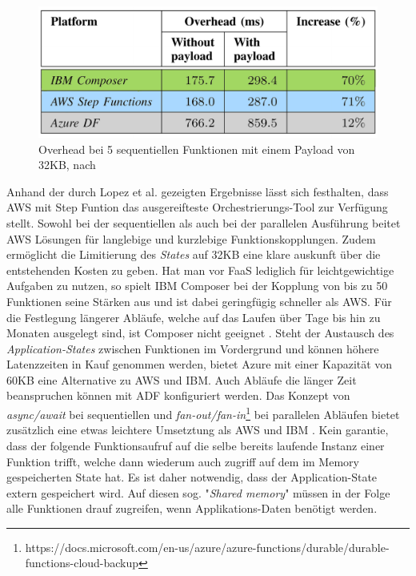 \documentclass[11pt]{article}
\begin{document}
\begin{figure}[H]
\caption{Overhead bei 5 sequentiellen Funktionen mit einem Payload von 32KB, nach \cite{lopez2018comparison}}
\label{fig:orchestration}
\centering
\includegraphics[width=1\textwidth]{Orchestration}
\end{figure} 
Anhand der durch Lopez et al. gezeigten Ergebnisse lässt sich festhalten, dass AWS mit Step Funtion das ausgereifteste Orchestrierungs-Tool zur Verfügung stellt. Sowohl bei der sequentiellen als auch bei der parallelen Ausführung beitet AWS Lösungen für langlebige und kurzlebige Funktionskopplungen. Zudem ermöglicht die Limitierung des \textit{States} auf 32KB eine klare auskunft über die entstehenden Kosten zu geben. Hat man vor FaaS lediglich für leichtgewichtige Aufgaben zu nutzen, so spielt IBM Composer bei der Kopplung von bis zu 50 Funktionen seine Stärken aus und ist dabei geringfügig schneller als AWS. Für die Festlegung längerer Abläufe, welche auf das Laufen über Tage bis hin zu Monaten ausgelegt sind, ist Composer nicht geeignet \cite{lopez2018comparison}. Steht der Austausch des \textit{Application-States} zwischen Funktionen im Vordergrund und können höhere Latenzzeiten in Kauf genommen werden, bietet Azure mit einer Kapazität von 60KB eine Alternative zu AWS und IBM. Auch Abläufe die länger Zeit beanspruchen können mit ADF konfiguriert werden. Das Konzept von \textit{async/await} bei sequentiellen und \textit{fan-out/fan-in}\footnote{https://docs.microsoft.com/en-us/azure/azure-functions/durable/durable-functions-cloud-backup} bei parallelen Abläufen bietet zusätzlich eine etwas leichtere Umsetztung als AWS und IBM \cite{lopez2018comparison}.
Kein garantie, dass der folgende Funktionsaufruf auf die selbe bereits laufende Instanz einer Funktion trifft, welche dann wiederum auch zugriff auf dem im Memory gespeicherten State hat. Es ist daher notwendig, dass der Application-State extern gespeichert wird. Auf diesen sog. "\textit{Shared memory}" müssen in der Folge alle Funktionen drauf zugreifen, wenn Applikations-Daten benötigt werden.
\end{document}
